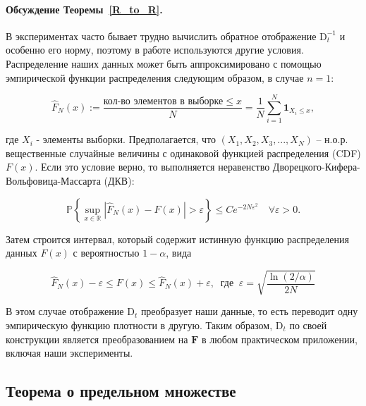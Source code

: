         \paragraph{Обсуждение Теоремы~\ref{R_to_R}.} В экспериментах часто бывает трудно вычислить обратное отображение $\text{D}_t^{-1}$ и особенно его норму, поэтому в работе используются другие условия. 
        Распределение наших данных может быть аппроксимировано с помощью эмпирической функции распределения \citep{dvoretzky1956asymptotic} следующим образом, в случае $n=1$:

        \begin{equation*}
            \hat{F}_N(x) := \frac{\text{кол-во элементов в выборке} \leq x}{N} = \dfrac{1}{N}\sum\limits_{i=1}^N \textbf{1}_{X_i \leq x},
        \end{equation*}

        где $X_i$ - элементы выборки. Предполагается, что $(X_1, X_2, X_3, ... , X_N)$ -- н.о.р. вещественные случайные величины с одинаковой функцией распределения (CDF) $F(x)$. Если это условие верно, то выполняется неравенство Дворецкого-Кифера-Вольфовица-Массарта (ДКВ):

        \begin{equation*}\label{DKW}
            \mathbb{P}\left\{\underset{x \in \mathbb{R}}{\sup}\left|\hat{F}_N(x) - F(x)\right| > \varepsilon \right\} \leq C e^{-2N\varepsilon^2} \quad 
            \forall \varepsilon > 0.
        \end{equation*}

        Затем строится интервал, который содержит истинную функцию распределения данных $F(x)$ с вероятностью $1 - \alpha$, вида

        \begin{equation*}
            \hat{F}_N(x) - \varepsilon \leq F(x) \leq \hat{F}_N(x) + \varepsilon, ~ \text{ где } ~ \varepsilon = \sqrt{\frac{\ln(2/\alpha)}{2N}}
        \end{equation*}

        В этом случае отображение $\text{D}_t$ преобразует наши данные, то есть переводит одну эмпирическую функцию плотности в другую. Таким образом, $\text{D}_t$ по своей конструкции является преобразованием на $\textbf{F}$ в любом практическом приложении, включая наши эксперименты.

    \subsection{Теорема о предельном множестве}

